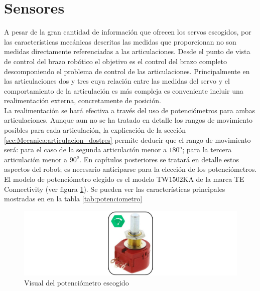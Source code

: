 \section{Sensores} \label{sec:Electronica:Sensores}
    A pesar de la gran cantidad de información que ofrecen los servos escogidos, por las características mecánicas descritas las medidas que proporcionan no son medidas directamente referenciadas a las articulaciones. Desde el punto de vista de control del brazo robótico el objetivo es el control del brazo completo descomponiendo el problema de control de las articulaciones. Principalmente en las articulaciones dos y tres cuya relación entre las medidas del servo y el comportamiento de la articulación es más compleja es conveniente incluir una realimentación externa, concretamente de posición.
    \\

    La realimentación se hará efectiva a través del uso de potenciómetros para ambas articulaciones. Aunque aun no se ha tratado en detalle los rangos de movimiento posibles para cada articulación, la explicación de la sección \ref{sec:Mecanica:articulacion_dostres} permite deducir que el rango de movimiento será: para el caso de la segunda articulación menor a $180^o$; para la tercera articulación menor a $90^o$. En capítulos posteriores se tratará en detalle estos aspectos del robot; es necesario anticiparse para la elección de los potenciómetros.
    \\

    El modelo de potenciómetro elegido es el modelo TW1502KA de la marca TE Connectivity (ver figura \ref{fig:Electronica:potenciometro}). Se pueden ver las características principales mostradas en \cite{potenciometroSheet} en la tabla \ref{tab:potenciometro}

    \begin{figure}[H]
    	\centering
    	\includegraphics[width=\textwidth]{figuras/Imagenes_Electronica/potenciometro.jpg}
    	\caption{Visual del potenciómetro escogido}
    	\label{fig:Electronica:potenciometro}
    \end{figure}

